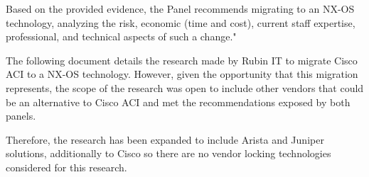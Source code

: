Based on the provided evidence, the Panel recommends migrating to an NX-OS technology, analyzing the risk, economic (time and cost), current staff expertise, professional, and technical aspects of such a change."

The following document details the research made by Rubin IT to migrate Cisco ACI to a NX-OS technology. However, given the opportunity that this migration represents, the scope of the research was open to include other vendors that could be an alternative to Cisco ACI and met the recommendations exposed by both panels.

Therefore, the research has been expanded to include Arista and Juniper solutions, additionally to Cisco so there are no vendor locking technologies considered for this research.